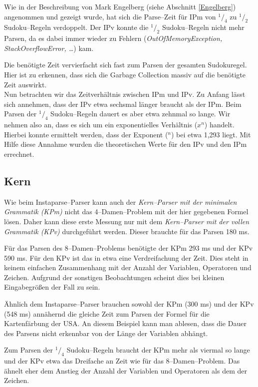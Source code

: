 \documentclass[ngerman,a4paper,abstracton,open=right,twoside=false,toc=listofnumbered,bibtotocnumbered]{scrreprt}
\begin{document}
Wie in der Beschreibung von Mark Engelberg (siehe Abschnitt \ref{Engelberg}) angenommen und gezeigt wurde, hat sich die Parse--Zeit für IPm von $^1/_4$ zu $^1/_2$ Sudoku--Regeln verdoppelt. Der IPv konnte die $^1/_2$ Sudoku--Regeln nicht mehr Parsen, da es dabei immer wieder zu Fehlern (\emph{OutOfMemoryException, StackOverflowError, \dots}) kam.

Die benötigte Zeit vervierfacht sich fast zum Parsen der gesamten Sudokuregel. Hier ist zu erkennen, dass sich die Garbage Collection massiv auf die benötigte Zeit auswirkt.\\

Nun betrachten wir das Zeitverhältnis zwischen IPm und IPv. Zu Anfang lässt sich annehmen, dass der IPv etwa sechsmal länger braucht als der IPm. Beim Parsen der $^1/_4$ Sudoku--Regeln dauert es aber etwa zehnmal so lange. Wir nehmen also an, dass es sich um ein exponentielles Verhältnis ($x^n$) handelt. Hierbei konnte ermittelt werden, dass der Exponent ($^n$) bei etwa 1,293 liegt. Mit Hilfe diese Annahme wurden die theoretischen Werte für den IPv und den IPm errechnet.

\subsection{Kern}

Wie beim Instaparse--Parser kann auch der \emph{Kern--Parser mit der minimalen Grammatik (KPm)} nicht das 4--Damen--Problem mit der hier gegebenen Formel lösen. Daher kann diese erste Messung nur mit dem \emph{Kern--Parser mit der vollen Grammatik (KPv)} durchgeführt werden. Dieser brauchte für das Parsen 180 ms.

Für das Parsen des 8--Damen--Problems benötigte der KPm 293 ms und der KPv 590 ms. Für den KPv ist das in etwa eine Verdreifachung der Zeit. Dies steht in keinem einfachen Zusammenhang mit der Anzahl der Variablen, Operatoren und Zeichen. Aufgrund der sonstigen Beobachtungen scheint dies bei kleinen Eingabegrößen der Fall zu sein.

Ähnlich dem Instaparse--Parser brauchen sowohl der KPm (300 ms) und der KPv (548 ms) annähernd die gleiche Zeit zum Parsen der Formel für die Kartenfärbung der USA. An diesem Beispiel kann man ablesen, dass die Dauer des Parsens nicht erkennbar von der Länge der Variablen abhängt.

Zum Parsen der $^1/_4$ Sudoku--Regeln braucht der KPm mehr als viermal so lange und der KPv etwa das Dreifache an Zeit wie für das 8--Damen--Problem. Das ähnelt eher dem Anstieg der Anzahl der Variablen und Operatoren als dem der Zeichen.
\end{document}
